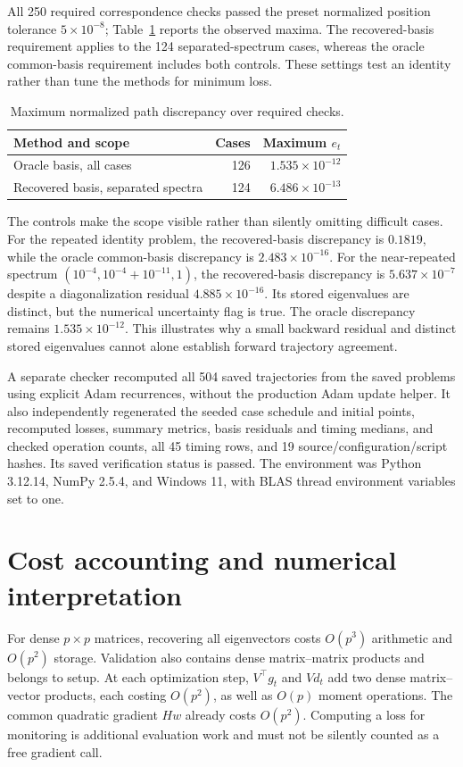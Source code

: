 \documentclass[11pt,a4paper]{article}
\begin{document}
All 250 required correspondence checks passed the preset normalized position
tolerance $5\times10^{-8}$; Table~\ref{tab:errors} reports the observed maxima.
The recovered-basis requirement applies to the 124 separated-spectrum cases,
whereas the oracle common-basis requirement includes both controls. These
settings test an identity rather than tune the methods for minimum loss.

\begin{table}[htbp]
 \centering
 \caption{Maximum normalized path discrepancy over required checks.}
 \label{tab:errors}
 \begin{tabular}{lrr}
 \toprule
 Method and scope & Cases & Maximum $e_t$ \\
 \midrule
 Oracle basis, all cases & 126 & $1.535\times10^{-12}$ \\
 Recovered basis, separated spectra & 124 & $6.486\times10^{-13}$ \\
 \bottomrule
 \end{tabular}
\end{table}

The controls make the scope visible rather than silently omitting difficult
cases. For the repeated identity problem, the recovered-basis discrepancy is
$0.1819$, while the oracle common-basis discrepancy is $2.483\times10^{-16}$.
For the near-repeated spectrum
$(10^{-4},10^{-4}+10^{-11},1)$, the recovered-basis discrepancy is
$5.637\times10^{-7}$ despite a diagonalization residual
$4.885\times10^{-16}$. Its stored eigenvalues are distinct, but the numerical
uncertainty flag is true. The oracle discrepancy remains
$1.535\times10^{-12}$. This illustrates why a small backward residual and
distinct stored eigenvalues cannot alone establish forward trajectory agreement.

A separate checker recomputed all 504 saved trajectories from the saved
problems using explicit Adam recurrences, without the production Adam update
helper. It also independently regenerated the seeded case schedule and initial
points, recomputed losses, summary metrics, basis residuals and timing medians,
and checked operation counts, all 45 timing rows, and 19
source/configuration/script hashes. Its saved verification status
is passed. The environment was Python 3.12.14, NumPy 2.5.4, and Windows 11,
with BLAS thread environment variables set to one.

\section{Cost accounting and numerical interpretation}
For dense $p\times p$ matrices, recovering all eigenvectors costs
$O(p^3)$ arithmetic and $O(p^2)$ storage. Validation also contains dense
matrix--matrix products and belongs to setup. At each optimization step,
$V^\top g_t$ and $Vd_t$ add two dense matrix--vector products, each costing
$O(p^2)$, as well as $O(p)$ moment operations. The common quadratic gradient
$Hw$ already costs $O(p^2)$. Computing a loss for monitoring is additional
evaluation work and must not be silently counted as a free gradient call.
\end{document}
